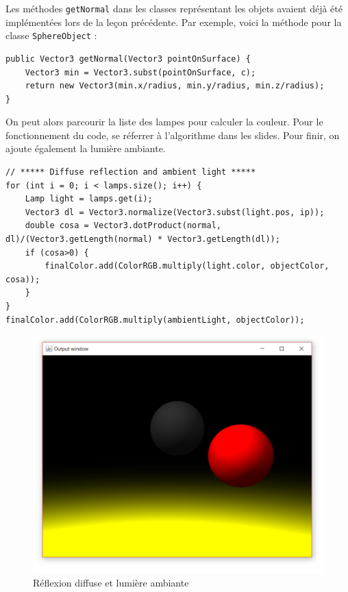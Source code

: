Les méthodes \texttt{getNormal} dans les classes représentant les objets avaient déjà été implémentées lors de la leçon précédente. Par exemple, voici la méthode pour la classe \texttt{SphereObject} :

\begin{lstlisting}
public Vector3 getNormal(Vector3 pointOnSurface) {
    Vector3 min = Vector3.subst(pointOnSurface, c);
    return new Vector3(min.x/radius, min.y/radius, min.z/radius);
}
\end{lstlisting}

On peut alors parcourir la liste des lampes pour calculer la couleur. Pour le fonctionnement du code, se réferrer à l'algorithme dans les slides. Pour finir, on ajoute également la lumière ambiante.

\begin{lstlisting}
// ***** Diffuse reflection and ambient light *****
for (int i = 0; i < lamps.size(); i++) {
    Lamp light = lamps.get(i);
    Vector3 dl = Vector3.normalize(Vector3.subst(light.pos, ip));
    double cosa = Vector3.dotProduct(normal, dl)/(Vector3.getLength(normal) * Vector3.getLength(dl));
    if (cosa>0) {
        finalColor.add(ColorRGB.multiply(light.color, objectColor, cosa));
    }
}
finalColor.add(ColorRGB.multiply(ambientLight, objectColor));
\end{lstlisting}

\begin{figure}[H]
	\caption{\label{10_1} Réflexion diffuse et lumière ambiante}
	\centering
	\includegraphics[scale = 0.4]{Figures/10_1.png}
\end{figure}

